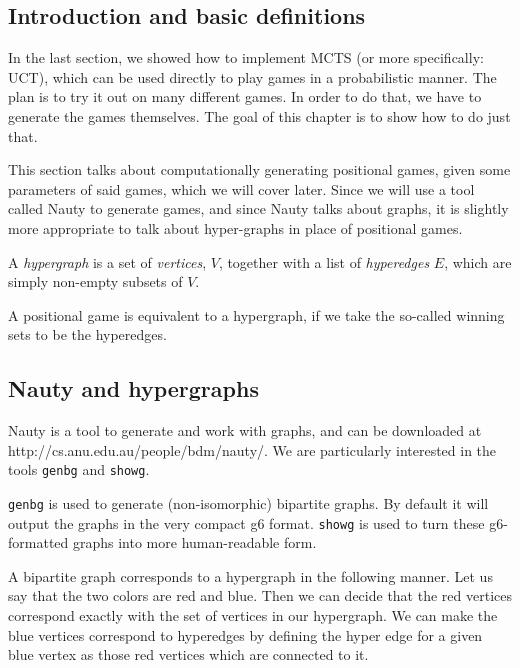 \subsection{Introduction and basic definitions}

In the last section, we showed how to implement MCTS (or more specifically: UCT), which can be used directly to play games in a probabilistic manner.
The plan is to try it out on many different games.
In order to do that, we have to generate the games themselves.
The goal of this chapter is to show how to do just that.

This section talks about computationally generating positional games, given some parameters of said games, which we will cover later.
Since we will use a tool called Nauty to generate games, and since Nauty talks about graphs, it is slightly more appropriate to talk about hyper-graphs in place of positional games.

\begin{definition}
  A \emph{hypergraph} is a set of \emph{vertices}, $V$, together with a list of \emph{hyperedges} $E$, which are simply non-empty subsets of $V$.
\end{definition}


A positional game is equivalent to a hypergraph, if we take the so-called winning sets to be the hyperedges.



\subsection{Nauty and hypergraphs}


Nauty is a tool to generate and work with graphs, and can be downloaded at http://cs.anu.edu.au/people/bdm/nauty/.
We are particularly interested in the tools \texttt{genbg} and \texttt{showg}.

\texttt{genbg} is used to generate (non-isomorphic) bipartite graphs. By default it will output the graphs in the very compact g6 format.
\texttt{showg} is used to turn these g6-formatted graphs into more human-readable form.

A bipartite graph corresponds to a hypergraph in the following manner.
Let us say that the two colors are red and blue. Then we can decide that the red vertices correspond exactly with the set of vertices in our hypergraph.
We can make the blue vertices correspond to hyperedges by defining the hyper edge for a given blue vertex as those red vertices which are connected to it.


